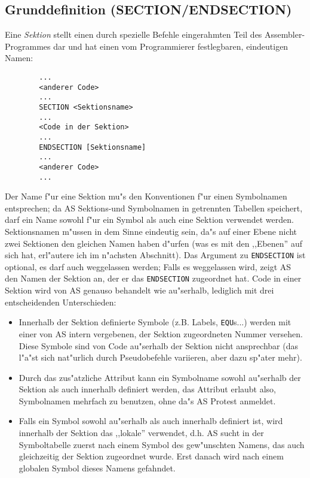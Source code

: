 \documentclass[12pt,a4paper,twoside]{report}
\newcommand{\ii}[1]{{\it #1}}
\newcommand{\tty}[1]{{\tt #1}}
\begin{document}

\subsection{Grunddefinition (SECTION/ENDSECTION)}

Eine \ii{Sektion} stellt einen durch spezielle Befehle eingerahmten
Teil des Assembler-Programmes dar und hat einen vom Programmierer
festlegbaren, eindeutigen Namen:
\begin{verbatim}
        ...
        <anderer Code>
        ...
        SECTION <Sektionsname>
        ...
        <Code in der Sektion>
        ...
        ENDSECTION [Sektionsname]
        ...
        <anderer Code>
        ...
\end{verbatim}
Der Name f"ur eine Sektion mu"s den Konventionen f"ur einen Symbolnamen
entsprechen; da AS Sektions-und Symbolnamen in getrennten Tabellen speichert,
darf ein Name sowohl f"ur ein Symbol als auch eine Sektion verwendet werden.
Sektionsnamen m"ussen in dem Sinne eindeutig sein, da"s auf einer Ebene
nicht zwei Sektionen den gleichen Namen haben d"urfen (was es mit den
,,Ebenen'' auf sich hat, erl"autere ich im n"achsten Abschnitt).  Das Argument
zu \tty{ENDSECTION} ist optional, es darf auch weggelassen werden; Falls
es weggelassen wird, zeigt AS den Namen der Sektion an, der er das
\tty{ENDSECTION} zugeordnet hat.  Code in einer Sektion wird von AS genauso
behandelt wie au"serhalb, lediglich mit drei entscheidenden Unterschieden:
\begin{itemize}
\item{Innerhalb der Sektion definierte Symbole (z.B. Labels, \tty{EQU}s...) werden
      mit einer von AS intern vergebenen, der Sektion zugeordneten Nummer
      versehen.  Diese Symbole sind von Code au"serhalb der Sektion nicht
      ansprechbar (das l"a"st sich nat"urlich durch Pseudobefehle variieren,
      aber dazu sp"ater mehr).}
\item{Durch das zus"atzliche Attribut kann ein Symbolname sowohl au"serhalb
      der Sektion als auch innerhalb definiert werden, das Attribut erlaubt
      also, Symbolnamen mehrfach zu benutzen, ohne da"s AS Protest anmeldet.}
\item{Falls ein Symbol sowohl au"serhalb als auch innerhalb definiert ist,
      wird innerhalb der Sektion das ,,lokale'' verwendet, d.h. AS sucht
      in der Symboltabelle zuerst nach einem Symbol des gew"unschten Namens,
      das auch gleichzeitig der Sektion zugeordnet wurde.  Erst danach wird
      nach einem globalen Symbol dieses Namens gefahndet.}
\end{itemize}
\end{document}
